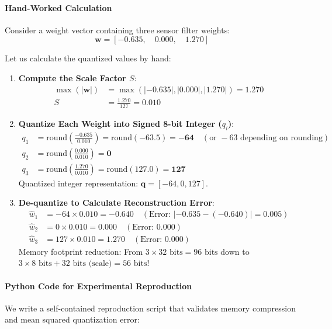 \paragraph{Hand-Worked Calculation}
Consider a weight vector containing three sensor filter weights:
\begin{equation*}
\mathbf{w} = [-0.635, \quad 0.000, \quad 1.270]
\end{equation*}

Let us calculate the quantized values by hand:
\begin{enumerate}
    \item \textbf{Compute the Scale Factor $S$}:
    \begin{align*}
    \max(|\mathbf{w}|) &= \max(|-0.635|, |0.000|, |1.270|) = 1.270 \\
    S &= \frac{1.270}{127} = \mathbf{0.010}
    \end{align*}

    \item \textbf{Quantize Each Weight into Signed 8-bit Integer ($q_i$)}:
    \begin{align*}
    q_1 &= \text{round}\left(\frac{-0.635}{0.010}\right) = \text{round}(-63.5) = \mathbf{-64} \quad (\text{or } -63 \text{ depending on rounding}) \\
    q_2 &= \text{round}\left(\frac{0.000}{0.010}\right) = \mathbf{0} \\
    q_3 &= \text{round}\left(\frac{1.270}{0.010}\right) = \text{round}(127.0) = \mathbf{127}
    \end{align*}
    Quantized integer representation: $\mathbf{q} = [-64, 0, 127]$.

    \item \textbf{De-quantize to Calculate Reconstruction Error}:
    \begin{align*}
    \hat{w}_1 &= -64 \times 0.010 = \mathbf{-0.640} \quad (\text{Error: } |-0.635 - (-0.640)| = 0.005) \\
    \hat{w}_2 &= 0 \times 0.010 = \mathbf{0.000} \quad (\text{Error: } 0.000) \\
    \hat{w}_3 &= 127 \times 0.010 = \mathbf{1.270} \quad (\text{Error: } 0.000)
    \end{align*}
    Memory footprint reduction: From $3 \times 32\text{ bits} = 96\text{ bits}$ down to $3 \times 8\text{ bits} + 32\text{ bits (scale)} = 56\text{ bits}$!
\end{enumerate}

\paragraph{Python Code for Experimental Reproduction}
We write a self-contained reproduction script that validates memory compression and mean squared quantization error:

